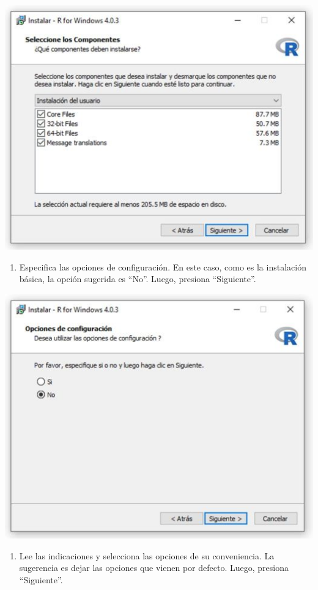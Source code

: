\documentclass[
]{book}
\providecommand{\tightlist}{%
  \setlength{\itemsep}{0pt}\setlength{\parskip}{0pt}}
\begin{document}
\includegraphics{data/10.png}

\begin{enumerate}
\def\labelenumi{\arabic{enumi}.}
\setcounter{enumi}{10}
\tightlist
\item
  Especifica las opciones de configuración. En este caso, como es la instalación básica, la opción sugerida es ``No''. Luego, presiona ``Siguiente''.
\end{enumerate}

\includegraphics{data/11.png}

\begin{enumerate}
\def\labelenumi{\arabic{enumi}.}
\setcounter{enumi}{11}
\tightlist
\item
  Lee las indicaciones y selecciona las opciones de su conveniencia. La sugerencia es dejar las opciones que vienen por defecto. Luego, presiona ``Siguiente''.
\end{enumerate}
\end{document}
